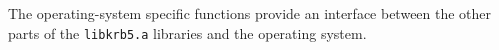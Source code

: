 The operating-system specific functions provide an interface between the
other parts of the {\tt libkrb5.a} libraries and the operating system.
